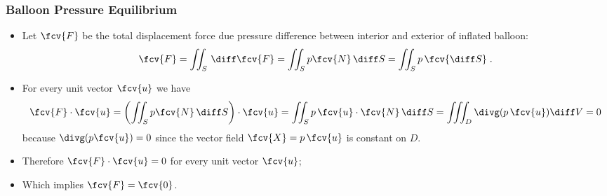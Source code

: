 \begin{frame}
  \frametitle{Balloon Pressure Equilibrium}

\begin{itemize}
\item \pause Let $\fcv{F}$ be the total displacement force due pressure difference between interior and exterior of inflated balloon:
%
\[
\fcv{F} =  \iint_S \, \diff \fcv{F} = \iint_S p \fcv{N} \, \diff S = \iint_S p\, \fcv{\diff S} \; .
\]
\item \pause For every unit vector $\fcv{u}$ we have
%
\[
  \fcv{F} \cdot \fcv{u} = \left(\iint_S p \fcv{N} \, \diff S \right) \cdot \fcv{u} = \iint_S p\, \fcv{u} \cdot  \fcv{N} \, \diff S = \iiint_D \divg (p\, \fcv{u}) \diff V = 0
\]
%
because $\divg (p \fcv{u}) = 0$ since the vector field $\fcv{X}= p\, \fcv{u}$ is constant on $D$.
\item Therefore $\fcv{F}\cdot \fcv{u} = 0$ for every unit vector $\fcv{u}$;
    \item \pause Which implies $\fcv{F}=\fcv{0}$.
\end{itemize}

\end{frame}